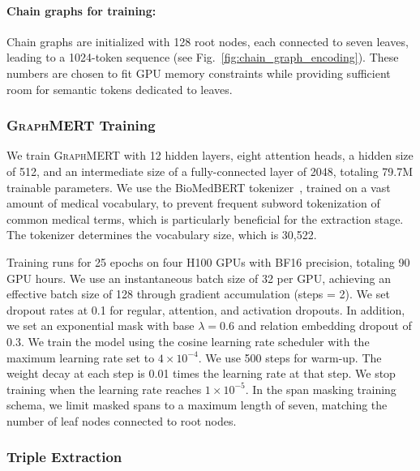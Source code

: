 \documentclass[10pt]{article}
\newcommand{\ours}{\textsc{GraphMERT}\xspace}
\begin{document}
\paragraph{Chain graphs for training:} Chain graphs are initialized with 128 root nodes, each connected to seven leaves, leading to a 1024-token sequence (see Fig.~\ref{fig:chain_graph_encoding}). These numbers are chosen to fit GPU memory constraints while providing sufficient room for semantic tokens dedicated to leaves. 

\subsubsection{\ours Training}
\label{subsubsec:results_graphmert_training}
We train \ours with 12 hidden layers, eight attention heads, a hidden size of 512, and an intermediate size of a fully-connected layer of 2048, totaling 79.7M trainable parameters. We use the BioMedBERT tokenizer~\cite{biomedbert}, trained on a vast amount of medical vocabulary, to prevent frequent subword tokenization of common medical terms, which is particularly beneficial for the extraction stage. The tokenizer determines the vocabulary size, which is 30,522.

Training runs for 25 epochs on four H100 GPUs with BF16 precision, totaling 90 GPU hours. We use an instantaneous batch size of 32 per GPU, achieving an effective batch size of 128 through gradient accumulation (steps = 2). We set dropout rates at 0.1 for regular, attention, and activation dropouts. In addition, we set an exponential mask with base $\lambda = 0.6$ and relation embedding dropout of 0.3. We train the model using the cosine learning rate scheduler with the maximum learning rate set to $4 \times 10^{-4}$. We use 500 steps for warm-up. The weight decay at each step is 0.01 times the learning rate at that step. We stop training when the learning rate reaches  $1 \times 10^{-5}$. In the span masking training schema, we limit masked spans to a maximum length of seven, matching the number of leaf nodes connected to root nodes. 

\subsubsection{Triple Extraction}
\label{subsubsec:triple_extraction}
\end{document}

